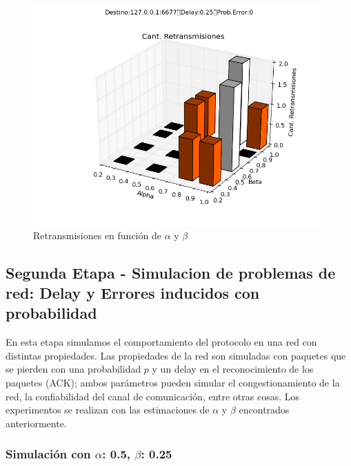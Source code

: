 \begin{figure}[H]
  \centering	
	\includegraphics[scale=0.5]{../analisis/graficos_tablas/graficos_en_funcion_de_alfa_y_beta/graficos/retransmisiones.png}
  \caption{Retransmisiones en funci\'on de $\alpha$ y $\beta$}
	\label{fig:histo-src-sitiotrabajo}
\end{figure}







\subsection{Segunda Etapa - Simulacion de problemas de red: Delay y Errores inducidos con probabilidad}
En esta etapa simulamos el comportamiento del protocolo en una red con distintas propiedades. Las propiedades de la red son simuladas con paquetes que se pierden con una probabilidad $p$ y un delay en el reconocimiento de los paquetes (ACK); ambos parámetros pueden simular el congestionamiento de la red, la confiabilidad del canal de comunicación, entre otras cosas. Los experimentos se realizan con las estimaciones de $\alpha$ y $\beta$ encontrados anteriormente.








\subsubsection{Simulación con $\alpha$: 0.5, $\beta$: 0.25}


